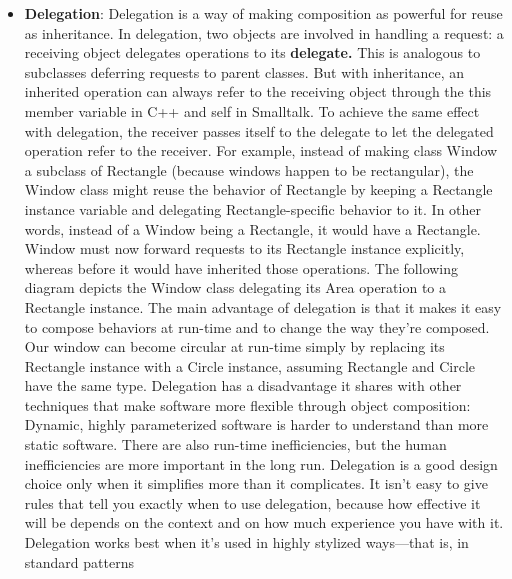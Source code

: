 \documentclass{report}
\begin{document}
\begin{itemize}
            \bigbreak \noindent 
            That leads us to our second principle of object-oriented design:
            \begin{center}
                "\textit{Favor object composition over class inheritance}"
            \end{center}
            Ideally, you shouldn't have to create new components to achieve reuse. You should be able to get all the functionality you need just by assembling existing components through object composition. But this is rarely the case, because the set of available components is never quite rich enough in practice. Reuse by inheritance makes it easier to make new components that can be composed with old ones. Inheritance and object composition thus work together.
        \item \textbf{Delegation}: Delegation is a way of making composition as powerful for reuse as inheritance. In delegation, two objects are involved in handling a request: a receiving object delegates operations to its \textbf{delegate.}
            \bigbreak \noindent 
            This is analogous to subclasses deferring requests to parent classes. But with inheritance, an inherited operation can always refer to the receiving object through the this member variable in C++ and self in Smalltalk. To achieve the same effect with delegation, the receiver passes itself to the delegate to let the delegated operation refer to the receiver.
            \bigbreak \noindent 
            For example, instead of making class Window a subclass of Rectangle (because windows happen to be rectangular), the Window class might reuse the behavior of Rectangle by keeping a Rectangle instance variable and delegating Rectangle-specific behavior to it. In other words, instead of a Window being a Rectangle, it would have a Rectangle. Window must now forward requests to its Rectangle instance explicitly, whereas before it would have inherited those operations.
            \bigbreak \noindent 
            The following diagram depicts the Window class delegating its Area operation to a Rectangle instance.
            \bigbreak \noindent 
            \bigbreak \noindent 
            The main advantage of delegation is that it makes it easy to compose behaviors at run-time and to change the way they're composed. Our window can become circular at run-time simply by replacing its Rectangle instance with a Circle instance, assuming Rectangle and Circle have the same type.
            \bigbreak \noindent 
            Delegation has a disadvantage it shares with other techniques that make software more flexible through object composition: Dynamic, highly parameterized software is harder to understand than more static software. There are also run-time inefficiencies, but the human inefficiencies are more important in the long run. Delegation is a good design choice only when it simplifies more than it complicates. It isn't easy to give rules that tell you exactly when to use delegation, because how effective it will be depends on the context and on how much experience you have with it. Delegation works best when it's used in highly stylized ways—that is, in standard patterns

\end{itemize}
\end{document}
